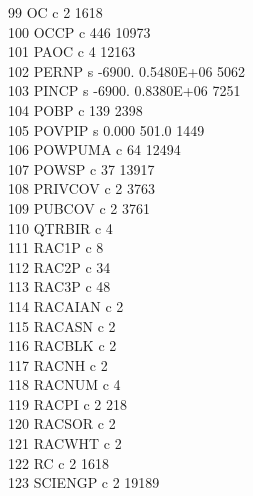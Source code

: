\documentclass[12pt]{article}
\begin{document}
      99  OC         c                                  2      1618\\
     100  OCCP       c                                446     10973\\
     101  PAOC       c                                  4     12163\\
     102  PERNP      s   -6900.       0.5480E+06               5062\\
     103  PINCP      s   -6900.       0.8380E+06               7251\\
     104  POBP       c                                139      2398\\
     105  POVPIP     s    0.000        501.0                   1449\\
     106  POWPUMA    c                                 64     12494\\
     107  POWSP      c                                 37     13917\\
     108  PRIVCOV    c                                  2      3763\\
     109  PUBCOV     c                                  2      3761\\
     110  QTRBIR     c                                  4\\
     111  RAC1P      c                                  8\\
     112  RAC2P      c                                 34\\
     113  RAC3P      c                                 48\\
     114  RACAIAN    c                                  2\\
     115  RACASN     c                                  2\\
     116  RACBLK     c                                  2\\
     117  RACNH      c                                  2\\
     118  RACNUM     c                                  4\\
     119  RACPI      c                                  2       218\\
     120  RACSOR     c                                  2\\
     121  RACWHT     c                                  2\\
     122  RC         c                                  2      1618\\
     123  SCIENGP    c                                  2     19189\\
\end{document}
